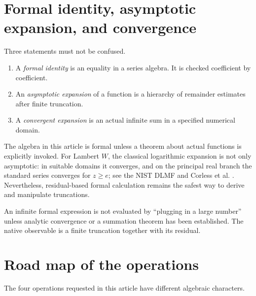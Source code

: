 \documentclass[11pt,openany]{book}
\theoremstyle{definition}
\theoremstyle{plain}
\theoremstyle{remark}
\begin{document}
\section{Formal identity, asymptotic expansion, and convergence}
Three statements must not be confused.

\begin{enumerate}
\item A \emph{formal identity} is an equality in a series algebra. It is checked coefficient by coefficient.
\item An \emph{asymptotic expansion} of a function is a hierarchy of remainder estimates after finite truncation.
\item A \emph{convergent expansion} is an actual infinite sum in a specified numerical domain.
\end{enumerate}

The algebra in this article is formal unless a theorem about actual functions is explicitly invoked. For Lambert \(W\), the classical logarithmic expansion is not only asymptotic: in suitable domains it converges, and on the principal real branch the standard series converges for \(z\ge e\); see the NIST DLMF and Corless et al. \cite{dlmf-W,corless-W}. Nevertheless, residual-based formal calculation remains the safest way to derive and manipulate truncations.

\begin{warningbox}
An infinite formal expression is not evaluated by ``plugging in a large number'' unless analytic convergence or a summation theorem has been established. The native observable is a finite truncation together with its residual.
\end{warningbox}

\section{Road map of the operations}
The four operations requested in this article have different algebraic characters.

\begin{center}
\end{center}
\end{document}
